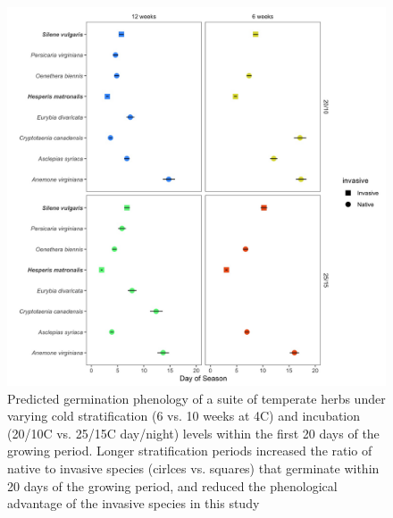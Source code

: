 \documentclass{article}\usepackage[]{graphicx}\usepackage[]{color}
\begin{document}
{\begin{figure}[h!]
    \centering
\includegraphics[width=\textwidth]{..//figure/commchange.jpeg}
   \caption{Predicted germination phenology of a suite of temperate herbs under varying cold stratification (6 vs. 10 weeks at 4\degree C) and incubation (20/10\degree C  vs. 25/15\degree C day/night) levels within the first 20 days of the growing period. Longer stratification periods increased the ratio of native to invasive species (cirlces vs. squares) that germinate within 20 days of the growing period, and reduced the phenological advantage of the invasive species in this study } 
   \label{fig:comm}
\end{figure}




}
\end{document}
